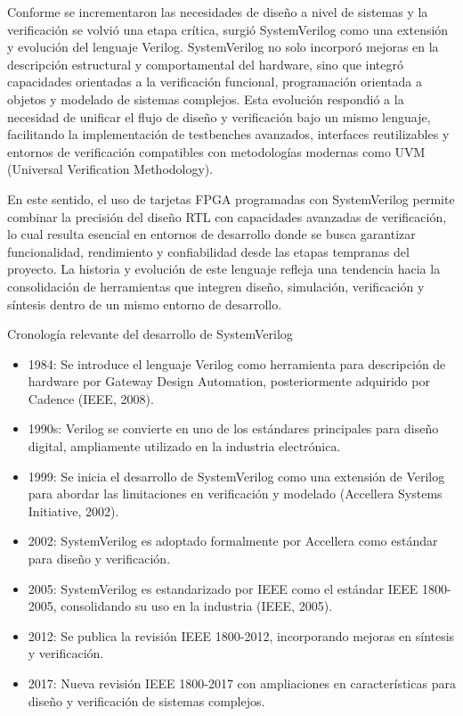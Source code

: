 Conforme se incrementaron las necesidades de diseño a nivel de sistemas y la verificación se volvió una etapa crítica, surgió SystemVerilog como una extensión y evolución del lenguaje Verilog. SystemVerilog no solo incorporó mejoras en la descripción estructural y comportamental del hardware, sino que integró capacidades orientadas a la verificación funcional, programación orientada a objetos y modelado de sistemas complejos. Esta evolución respondió a la necesidad de unificar el flujo de diseño y verificación bajo un mismo lenguaje, facilitando la implementación de testbenches avanzados, interfaces reutilizables y entornos de verificación compatibles con metodologías modernas como UVM (Universal Verification Methodology).

En este sentido, el uso de tarjetas FPGA programadas con SystemVerilog permite combinar la precisión del diseño RTL con capacidades avanzadas de verificación, lo cual resulta esencial en entornos de desarrollo donde se busca garantizar funcionalidad, rendimiento y confiabilidad desde las etapas tempranas del proyecto. La historia y evolución de este lenguaje refleja una tendencia hacia la consolidación de herramientas que integren diseño, simulación, verificación y síntesis dentro de un mismo entorno de desarrollo.

Cronología relevante del desarrollo de SystemVerilog 
\begin{itemize}
\item 1984: Se introduce el lenguaje Verilog como herramienta para descripción de hardware por Gateway Design Automation, posteriormente adquirido por Cadence (IEEE, 2008).
\item 1990s: Verilog se convierte en uno de los estándares principales para diseño digital, ampliamente utilizado en la industria electrónica.
\item 1999: Se inicia el desarrollo de SystemVerilog como una extensión de Verilog para abordar las limitaciones en verificación y modelado (Accellera Systems Initiative, 2002).
\item 2002: SystemVerilog es adoptado formalmente por Accellera como estándar para diseño y verificación.
\item 2005: SystemVerilog es estandarizado por IEEE como el estándar IEEE 1800-2005, consolidando su uso en la industria (IEEE, 2005).
\item 2012: Se publica la revisión IEEE 1800-2012, incorporando mejoras en síntesis y verificación.
\item 2017: Nueva revisión IEEE 1800-2017 con ampliaciones en características para diseño y verificación de sistemas complejos.
\end{itemize}

